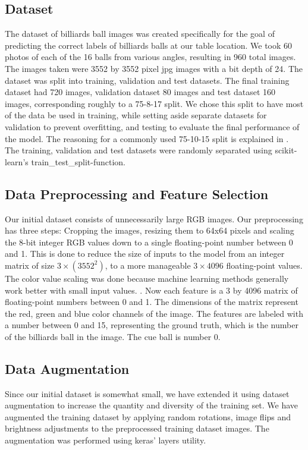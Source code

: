 \documentclass{article}
\begin{document}
\subsection{Dataset}
\label{sec:dataset}
The dataset of billiards ball images was created specifically for the goal of predicting the correct labels of billiards balls at our table location.
We took 60 photos of each of the 16 balls from various angles, resulting in 960 total images. The images taken were 3552 by 3552 pixel jpg images 
with a bit depth of 24. The dataset was split into training, validation and test datasets. The final training dataset had 720 images, 
validation dataset 80 images and test dataset 160 images, corresponding roughly to a 75-8-17 split. We chose this split to have most of the data 
be used in training, while setting aside separate datasets for validation to prevent overfitting, and testing to evaluate the final 
performance of the model. The reasoning for a commonly used 75-10-15 split is explained in \cite{josephOptimalRatioData2022}. The training, 
validation and test datasets were randomly separated using scikit-learn's train\_test\_split-function.

\subsection{Data Preprocessing and Feature Selection}
\label{sec:data_preprocessing}
Our initial dataset consists of unnecessarily large RGB images. Our preprocessing has three steps: Cropping the images, resizing them to 64x64 pixels 
and scaling the 8-bit integer RGB values down to a single floating-point number between 0 and 1. This is done to reduce the size of inputs to the model 
from an integer matrix of size $3\times(3552^2)$, to a more manageable $3\times 4096$ floating-point values. The color value scaling was done because machine
learning methods generally work better with small input values. \cite{ImportanceFeatureScaling}. Now each feature is a 3 by 4096 matrix of floating-point
numbers between 0 and 1. The dimensions of the matrix represent the red, green and blue color channels of the image. The features are labeled with a number 
between 0 and 15, representing the ground truth, which is the number of the billiards ball in the image. The cue ball is number 0.

\subsection{Data Augmentation}
\label{sec:data_augmentation}
Since our initial dataset is somewhat small, we have extended it using dataset augmentation to increase the quantity 
and diversity of the training set. We have augmented the training dataset by applying random rotations, 
image flips and brightness adjustments to the preprocessed training dataset images. The augmentation was performed using keras' layers utility.
\end{document}
